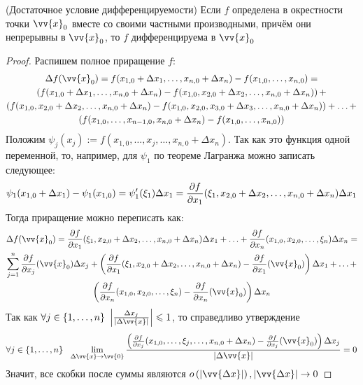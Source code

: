 \begin{theorem} (Достаточное условие дифференцируемости)
	Если $f$ определена в окрестности точки $\vv{x}_0$ вместе со своими частными производными, причём они непрерывны в $\vv{x}_0$, то $f$ дифференцируема в $\vv{x}_0$
\end{theorem}

\begin{proof}
	Распишем полное приращение $f$:
	\begin{multline*}
		\Delta f(\vv{x}_0) = f(x_{1, 0} + \Delta x_1, \ldots, x_{n, 0} + \Delta x_n) - f(x_{1, 0}, \ldots, x_{n, 0}) =
		\\
		\left(f(x_{1, 0} + \Delta x_1, \ldots, x_{n, 0} + \Delta x_n) - f(x_{1, 0}, x_{2, 0} + \Delta x_2, \ldots, x_{n, 0} + \Delta x_n)\right) +
		\\
		\left(f(x_{1, 0}, x_{2, 0} + \Delta x_2, \ldots, x_{n, 0} + \Delta x_n) - f(x_{1, 0}, x_{2, 0}, x_{3, 0} + \Delta x_3, \ldots, x_{n, 0} + \Delta x_n)\right) + \ldots +
		\\
		\left(f(x_{1, 0}, \ldots, x_{n - 1, 0}, x_{n, 0} + \Delta x_n) - f(x_{1, 0}, \ldots, x_{n, 0})\right)
	\end{multline*}
	Положим $\psi_j(x_j) := f(x_{1, 0}, \ldots, x_j, \ldots, x_{n, 0} + \Delta x_n)$. Так как это функция одной переменной, то, например, для $\psi_1$ по теореме Лагранжа можно записать следующее:
	\[
		\psi_1(x_{1, 0} + \Delta x_1) - \psi_1(x_{1, 0}) = \psi'_1(\xi_1)\Delta x_1 = \frac{\partial f}{\partial x_1}(\xi_1, x_{2, 0} + \Delta x_2, \ldots, x_{n, 0} + \Delta x_n)\Delta x_1
	\]
	Тогда приращение можно переписать как:
	\begin{multline*}
		\Delta f(\vv{x}_0) = \pd{f}{x_1}(\xi_1, x_{2, 0} + \Delta x_2, \ldots, x_{n, 0} + \Delta x_n)\Delta x_1 + \ldots + \pd{f}{x_n}(x_{1, 0}, x_{2, 0}, \ldots, \xi_n)\Delta x_n =
		\\
		\suml_{j = 1}^n \pd{f}{x_j} (\vv{x}_0) \Delta x_j + \left(\pd{f}{x_1} (\xi_1, x_{2, 0} + \Delta x_2, \ldots, x_{n, 0} + \Delta x_n) - \pd{f}{x_1}(\vv{x}_0)\right)\Delta x_1 + \ldots +
		\\
		\left(\pd{f}{x_n} (x_{1, 0}, x_{2, 0}, \ldots, \xi_n) - \pd{f}{x_n} (\vv{x}_0)\right)\Delta x_n
	\end{multline*}
	Так как $\forall j \in \range{n}\ \left|\frac{\Delta x_j}{|\Delta \vv{x}|}\right| \leq 1$, то справедливо утверждение
	\[
		\forall j \in \range{n}\ \ \liml_{\Delta\vv{x} \to \vv{0}}\frac{\left(\frac{\vdelta f}{\vdelta x_j}(x_{1, 0}, \ldots, \xi_j, \ldots, x_{n, 0} + \Delta x_n) - \frac{\vdelta f}{\vdelta x_j}(\vv{x}_0)\right) \Delta x_j}{|\Delta \vv{x}|} = 0
	\]
	Значит, все скобки после суммы являются $o\left(|\vv{\Delta x}|\right), |\vv{\Delta x}| \to 0$
\end{proof}